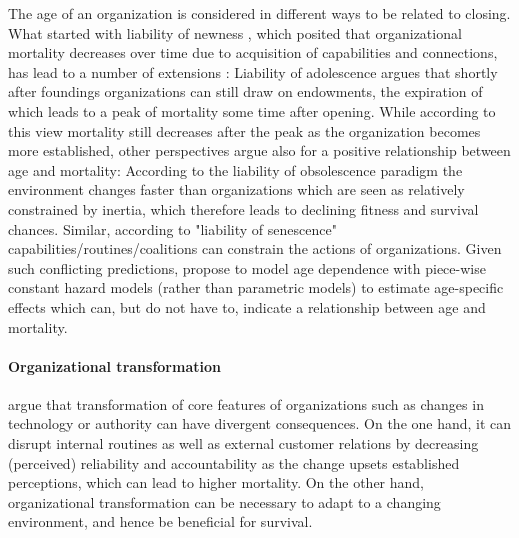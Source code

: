 \documentclass[12pt]{article}
\begin{document}
The age of an organization is considered in different ways to be related to closing.
What started with liability of newness \parencite{Stinchcombe_1965_structure}, which posited that organizational mortality decreases over time due to acquisition of capabilities and connections, has lead to a number of extensions \parencite{Carroll_Khessina_2019_demography,Hannan_1998_mortality}:
Liability of adolescence argues that shortly after foundings organizations can still draw on endowments, the expiration of which leads to a peak of mortality some time after opening.
While according to this view mortality still decreases after the peak as the organization becomes more established, other perspectives argue also for a positive relationship between age and mortality:
According to the liability of obsolescence paradigm the environment changes faster than organizations which are seen as relatively constrained by inertia, which therefore leads to declining fitness and survival chances.
Similar, according to "liability of senescence" capabilities/routines/coalitions can constrain the actions of organizations.
Given such conflicting predictions, \textcite{Carroll_Khessina_2019_demography} propose to model age dependence with piece-wise constant hazard models (rather than parametric models) to estimate age-specific effects which can, but do not have to, indicate a relationship between age and mortality.



\paragraph*{Organizational transformation}

\textcite{Carroll_Khessina_2019_demography} argue that transformation of core features of organizations such as changes in technology or authority can have divergent consequences. 
On the one hand, it can disrupt internal routines as well as external customer relations by decreasing (perceived) reliability and accountability as the change upsets established perceptions, which can lead to higher mortality. 
On the other hand, organizational transformation can be necessary to adapt to a changing environment, and hence be beneficial for survival.
\end{document}
